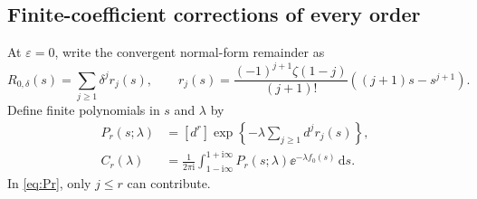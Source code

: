 \documentclass[11pt,a4paper]{article}
\numberwithin{equation}{section}
\theoremstyle{definition}
\theoremstyle{remark}
\newcommand{\dd}{\,\mathrm d}\newcommand{\ii}{\mathrm i}
\newcommand{\ep}{\varepsilon}\newcommand{\la}{\lambda}
\newcommand{\coef}[1]{[#1]}
\begin{document}
\subsection{Finite-coefficient corrections of every order}
At \(\ep=0\), write the convergent normal-form remainder as
\begin{equation}\label{eq:rj}
 R_{0,\delta}(s)=\sum_{j\ge1}\delta^j r_j(s),\qquad
 r_j(s)=\frac{(-1)^{j+1}\zeta(1-j)}{(j+1)!}
                       ((j+1)s-s^{j+1}).
\end{equation}
Define finite polynomials in \(s\) and \(\la\) by
\begin{align}
 P_r(s;\la)&=\coef{d^r}
       \exp\left\{-\la\sum_{j\ge1}d^jr_j(s)\right\},\label{eq:Pr}\\
 C_r(\la)&=\frac1{2\pi\ii}
   \int_{1-\ii\infty}^{1+\ii\infty}
       P_r(s;\la)\ee^{-\la f_0(s)}\dd s.\label{eq:Cr}
\end{align}
In \eqref{eq:Pr}, only \(j\le r\) can contribute.
\end{document}
